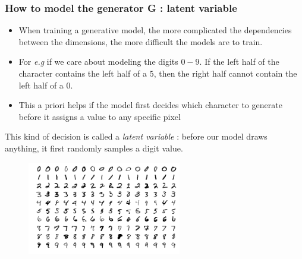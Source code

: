 \documentclass[french,9pt]{beamer}
\begin{document}
\begin{frame}
\frametitle{How to model the generator G : latent variable }

\begin{itemize}
\item When training a generative model, the more complicated the dependencies between the dimensions, the more difficult the models are to train. 
\item For \textit{e.g} if we care about modeling the digits $0-9$. If the left half of the character contains the left half of a $5$, then the right half cannot contain the left half of a $0$.
\item This a priori helps if the model first decides which character to generate before it assigns a value to any specific pixel
\end{itemize}

This kind of decision is called a \emph{latent variable} : before our model draws anything, it first randomly samples a digit value.

\begin{figure}
  \begin{center}
    \includegraphics[width=0.6\textwidth]{fig/mnist.png}
  \end{center}
\end{figure}

\end{frame}

\end{document}
